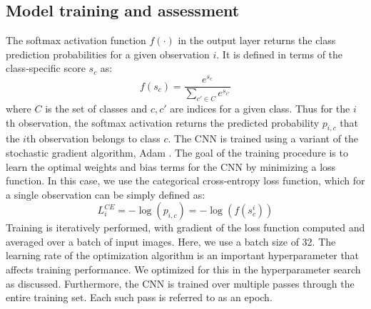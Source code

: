 \documentclass[Journal,letterpaper, SingleSpace, InsideFigs]{ascelike-new}
\begin{document}
\subsection{Model training and assessment}
The softmax activation function  $f(\cdot)$ in the output layer returns the class prediction probabilities for a given observation $i$. It is defined in terms of the class-specific score $s_c$ as:
\begin{equation}
    f(s_c) = \frac{e^{s_c}}{\sum\limits_{c' \in C} e^{s_{c'}}}
\end{equation}
where $C$ is the set of classes and $c, c'$ are indices for a given class.
Thus for the $i$th observation, the softmax activation returns the predicted probability $p_{i,c}$ that the $i$th observation belongs to class $c$.
The CNN is trained using a variant of the stochastic gradient algorithm, Adam \cite{kingma2017adam}.
The goal of the training procedure is to learn the optimal weights and bias terms for the CNN by minimizing a loss function. 
In this case, we use the categorical cross-entropy loss function, which for a single observation can be simply defined as:
\begin{equation}
    L_{i}^{CE} = -  \log( p_{i,c}) = - \log(f(s_c^i))
\end{equation}
Training is iteratively performed, with gradient of the loss function computed and averaged over a batch of input images.
Here, we use a batch size of 32.
The learning rate  of the optimization algorithm is an important hyperparameter that affects training performance.
We optimized for this in the hyperparameter search as discussed.
Furthermore, the CNN is trained over multiple passes through the entire training set.
Each such pass is referred to as an epoch.
\end{document}

